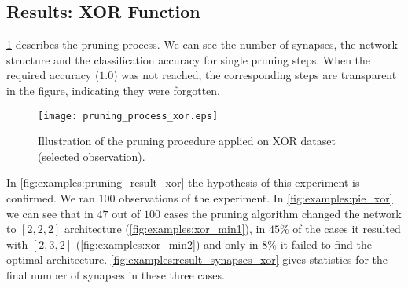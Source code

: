 \begin{table}[H]
\centering
{}
\caption{Experiment settings for the XOR example.}
\label{tab:examples:xor_settings}
\end{table}

\subsection*{Results: XOR Function}
\cref{fig:examples:pruning_process_xor} describes the pruning process. We can see the number of synapses, the network structure and the classification accuracy for single pruning steps. When the required accuracy ($ 1.0 $) was not reached, the corresponding steps are transparent in the figure, indicating they were forgotten.

\begin{figure}[H]
\centering
\texttt{[image: pruning\_process\_xor.eps]}
\caption{Illustration of the pruning procedure applied on XOR dataset (selected observation).}
\label{fig:examples:pruning_process_xor}
\end{figure}

In \cref{fig:examples:pruning_result_xor} the hypothesis of this experiment is confirmed. We ran $ 100 $ observations of the experiment. In \cref{fig:examples:pie_xor} we can see that in $ 47 $ out of $ 100 $ cases the pruning algorithm changed the network to $ [2, 2, 2] $ architecture (\cref{fig:examples:xor_min1}), in $ 45\% $ of the cases it resulted with $ [2, 3, 2] $ (\cref{fig:examples:xor_min2}) and only in $ 8\% $ it failed to find the optimal architecture. \cref{fig:examples:result_synapses_xor} gives statistics for the final number of synapses in these three cases.


